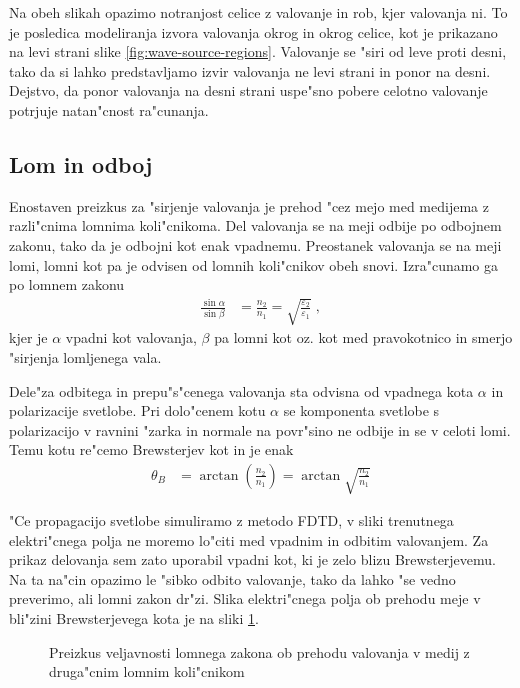 \documentclass[a4paper,10pt]{article}
\begin{document}
Na obeh slikah opazimo notranjost celice z valovanje in rob, kjer valovanja ni.
To je posledica modeliranja izvora valovanja okrog in okrog celice, kot je prikazano na levi strani slike \ref{fig:wave-source-regions}.
Valovanje se "siri od leve proti desni, tako da si lahko predstavljamo izvir valovanja ne levi strani in ponor na desni. 
Dejstvo, da ponor valovanja na desni strani uspe"sno pobere celotno valovanje potrjuje natan"cnost ra"cunanja. 

\subsection{Lom in odboj}
Enostaven preizkus za "sirjenje valovanja je prehod "cez mejo med medijema z razli"cnima lomnima koli"cnikoma. 
Del valovanja se na meji odbije po odbojnem zakonu, tako da je odbojni kot enak vpadnemu. 
Preostanek valovanja se na meji lomi, lomni kot pa je odvisen od lomnih koli"cnikov obeh snovi. 
Izra"cunamo ga po lomnem zakonu
\begin{align}
 \frac{\sin\alpha}{\sin\beta} &= \frac{n_2}{n_1} = \sqrt{\frac{\varepsilon_2}{\varepsilon_1}}\;, 
\end{align}
kjer je $\alpha$ vpadni kot valovanja, $\beta$ pa lomni kot oz. kot med pravokotnico in smerjo "sirjenja lomljenega vala. 

Dele"za odbitega in prepu"s"cenega valovanja sta odvisna od vpadnega kota $\alpha$ in polarizacije svetlobe\cite{wiki:brewster}. 
Pri dolo"cenem kotu $\alpha$ se komponenta svetlobe s polarizacijo v ravnini "zarka in normale na povr"sino ne odbije in se v celoti lomi. 
Temu kotu re"cemo Brewsterjev kot in je enak
\begin{align}
 \theta_B &= \arctan\left(\frac{n_2}{n_1}\right) = \arctan\sqrt{\frac{n_2}{n_1}}
\end{align}

"Ce propagacijo svetlobe simuliramo z metodo \ac{FDTD}, v sliki trenutnega elektri"cnega polja ne moremo lo"citi med vpadnim in odbitim valovanjem. 
Za prikaz delovanja sem zato uporabil vpadni kot, ki je zelo blizu Brewsterjevemu. 
Na ta na"cin opazimo le "sibko odbito valovanje, tako da lahko "se vedno preverimo, ali lomni zakon dr"zi. 
Slika elektri"cnega polja ob prehodu meje v bli"zini Brewsterjevega kota je na sliki \ref{fig:refraction-test}. 

\begin{figure}[h]
 \centering
 \vspace{-1.4cm}
 
 \vspace{-1.7cm}
 \caption{Preizkus veljavnosti lomnega zakona ob prehodu valovanja v medij z druga"cnim lomnim koli"cnikom}
 \label{fig:refraction-test}
\end{figure}
\end{document}
